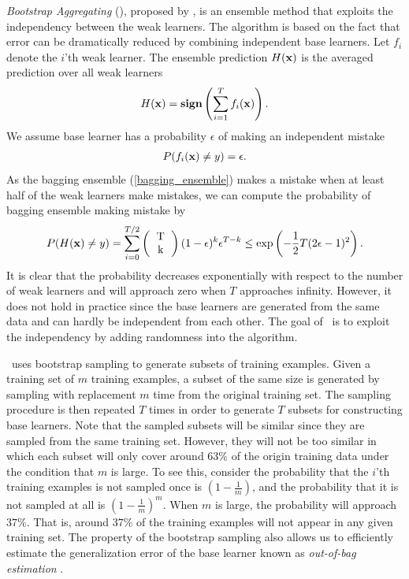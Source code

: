 {\textit{Bootstrap Aggregating} (\bagging), proposed by \citet{Breiman96bagging}, is an ensemble method that exploits the independency between the weak learners.
The algorithm is based on the fact that error can be dramatically reduced by combining independent base learners.
Let $f_i$ denote the $i$'th weak learner.
The ensemble prediction $H(\mathbf {x})$ is the averaged prediction over all weak learners
\begin{align}
	H(\mathbf {x}) = \textbf{sign}\left(\sum_{i=1}^{T}f_i(\mathbf {x})\right). \label{bagging_ensemble}
\end{align}
We assume base learner has a probability $\epsilon$ of making an independent mistake
\begin{align*}
	P(f_i(\mathbf {x}) \ne y) = \epsilon.
\end{align*}
As the bagging ensemble (\ref{bagging_ensemble}) makes a mistake when at least half of the weak learners make mistakes, we can compute the probability of bagging ensemble making mistake by
\begin{align*}
	P(H(\vx)\neq y) = \sum_{i=0}^{T/2}\left(\begin{tabular}{cc}T\\k\end{tabular}\right)(1-\epsilon)^k\epsilon^{T-k} \le\exp\left(-\frac{1}{2}T(2\epsilon-1)^2\right).
\end{align*}
It is clear that the probability decreases exponentially with respect to the number of weak learners and will approach zero when $T$ approaches infinity.
However, it does not hold in practice since the base learners are generated from the same data and can hardly be independent from each other.
The goal of \bagging\ is to exploit the independency by adding randomness into the algorithm.

\bagging\ uses bootstrap sampling \citep{Efron1994introduction} to generate subsets of training examples.
Given a training set of $m$ training examples, a subset of the same size is generated by sampling with replacement $m$ time from the original training set.
The sampling procedure is then repeated $T$ times in order to generate $T$ subsets for constructing base learners.
Note that the sampled subsets will be similar since they are sampled from the same training set.
However, they will not be too similar in which each subset will only cover around $63\%$ of the origin training data under the condition that $m$ is large.
To see this, consider the probability that the $i$'th training examples is not sampled once is $(1-\frac{1}{m})$, and the probability that it is not sampled at all is $(1-\frac{1}{m})^m$.
When $m$ is large, the probability will approach $37\%$. 
That is, around $37\%$ of the training examples will not appear in any given training set.
The property of the bootstrap sampling also allows us to efficiently estimate the generalization error of the base learner known as \textit{out-of-bag estimation} \citep{Breiman96out,Tibshirani1996bias,Wolpert99an}.

}
